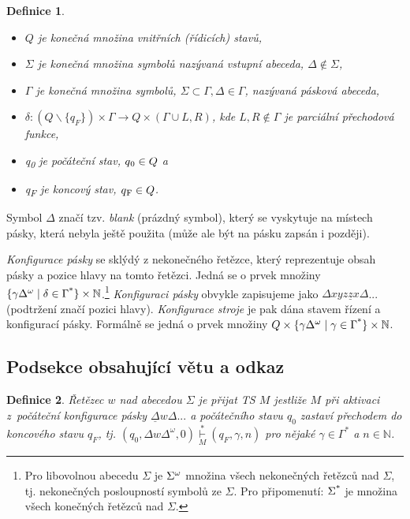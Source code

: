 \documentclass[11pt,a4paper]{article}
\newtheorem{definition}{Definice}
\begin{document}
\begin{twocolumn}
\begin{definition}
\begin{itemize}
\item $Q$ je konečná množina {\normalfont vnitřních (řídicích) stavů,}
\item $\Sigma$ je konečná množina symbolů nazývaná vstupní {\normalfont abeceda, $\Delta \notin \Sigma$,}
\item $\Gamma$ je konečná množina symbolů, $\Sigma \subset \Gamma, \Delta \in \Gamma$, nazývaná {\normalfont pásková abeceda,}
\item {$\delta : (Q \backslash \{q_F\})\times \Gamma \rightarrow Q \times (\Gamma \cup {L,R})$, kde $L,R \notin \Gamma$ je parciální {\normalfont přechodová funkce,}}
\item q\textsubscript{0} je {\normalfont počáteční stav,} $q\textsubscript{0} \in Q$ a
\item q\textsubscript{F} je {\normalfont koncový stav,} $q\textsubscript{F} \in Q$.
\end{itemize}
\end{definition}

Symbol $\Delta$ značí tzv. \emph{blank} (prázdný symbol), který se vyskytuje na místech pásky, která nebyla ještě použita (může ale být na pásku zapsán i později).

\emph{Konfigurace pásky} se sklýdý z nekonečného řetězce, který reprezentuje obsah pásky a pozice hlavy na tomto řetězci. Jedná se o prvek množiny $ \{\gamma\Delta\textsuperscript{$\omega$} \mid \delta\in\Gamma\textsuperscript{*}\}\times\mathbb{N}$.\footnote{Pro libovolnou abecedu $\Sigma$ je $\Sigma\textsuperscript{$\omega$}$ množina všech nekonečných řetězců nad $\Sigma$, tj. nekonečných posloupností symbolů ze $\Sigma$. Pro připomenutí: $\Sigma\textsuperscript{*}$ je množina všech konečných řetězců nad $\Sigma$.}
\emph{Konfiguraci pásky} obvykle zapisujeme jako $\Delta xyz\underline{z}x\Delta$...\\(podtržení značí pozici hlavy). \emph{Konfigurace stroje} je pak dána stavem řízení a konfigurací pásky. Formálně se jedná o prvek množiny $Q\times\{\gamma\Delta\textsuperscript{$\omega$}\mid\gamma\in\Gamma\textsuperscript{*}\}\times\mathbb{N}$.

\subsection{Podsekce obsahující větu a odkaz}

\begin{definition}
{\normalfont Řetězec $w$ nad abecedou $\Sigma$ je přijat TS} $M$ jestliže $M$ při aktivaci z~počáteční konfigurace pásky $\underline\Delta w\Delta...$ a počátečního stavu $q_0$ zastaví přechodem do koncového stavu $q_F$, tj. $(q_0, \Delta w \Delta^\omega, 0) \underset{M}{\overset{*}{\vdash}} (q_F, \gamma, n)$ pro nějaké $\gamma \in \Gamma^*$ a $ n \in \mathbb{N}$.


\end{definition}
\end{twocolumn}
\end{document}
